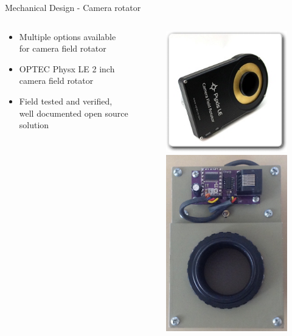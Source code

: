 \documentclass[11pt, aspectratio=169]{beamer}
\begin{document}
\begin{frame}[c]{Mechanical Design - Camera rotator}
    \begin{columns}[t]
            \begin{column}{.5\textwidth}
                \begin{itemize}
                    \item Multiple options available for camera field rotator 
                    \item OPTEC Physx LE 2 inch camera field rotator
                    \item Field tested and verified, well documented open source solution 
                \end{itemize}
            \end{column}

            \begin{column}{.5\textwidth}
                \begin{figure}
                     \includegraphics[height=0.5\textheight]{mechanical/19630_3_sm.jpg}
                     \includegraphics[height=0.5\textheight]{mechanical/derotator.png}
                \end{figure}
            \end{column}
        \end{columns}
    
\end{frame}
\end{document}

